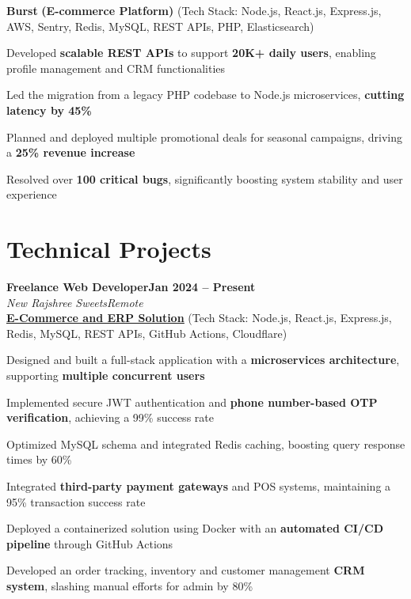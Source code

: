 \documentclass[letterpaper, 10pt]{article}
\newcommand{\heading}[2]{ \hspace{5pt}#1\hfill#2\\[1pt] }  %
\newcommand{\headingBf}[2]{ \heading{\textbf{#1}}{\textbf{#2}} }
\newcommand{\headingIt}[2]{ \heading{\textit{#1}}{\textit{#2}} }
\newenvironment{resume_list}{
\vspace{-3pt}                    %
\begin{itemize}[itemsep=-2pt, parsep=0.5pt, leftmargin=20pt] }{ \end{itemize}  %
\vspace{-3pt}                    %
}
\begin{document}
\vspace{3pt}

\hspace{10pt}\textbf{Burst} \textbf{(E-commerce Platform)} \small{(Tech Stack: Node.js, React.js, Express.js, AWS, Sentry, Redis, MySQL, REST APIs, PHP, Elasticsearch)}
\begin{resume_list}
    \item Developed \textbf{scalable REST APIs} to support \textbf{20K+ daily users}, enabling profile management and CRM functionalities 
    \item Led the migration from a legacy PHP codebase to Node.js microservices, \textbf{cutting latency by 45\%}
    \item Planned and deployed multiple promotional deals for seasonal campaigns, driving a \textbf{25\% revenue increase}
    \item Resolved over \textbf{100 critical bugs}, significantly boosting system stability and user experience
\end{resume_list}

\section{Technical Projects}
\headingBf{Freelance Web Developer}{Jan 2024 -- Present}
\headingIt{New Rajshree Sweets}{Remote}
\vspace{2pt}
\hspace{10pt}\textbf{\href{https://newrajshreesweets.com}{\underline{E-Commerce and ERP Solution}}}
\small{(Tech Stack: Node.js, React.js, Express.js, Redis, MySQL, REST APIs, GitHub Actions, Cloudflare)}
\begin{resume_list}
    \item Designed and built a full-stack application with a \textbf{microservices architecture}, supporting \textbf{multiple concurrent users}
    \item Implemented secure JWT authentication and \textbf{phone number-based OTP verification}, achieving a 99\% success rate
    \item Optimized MySQL schema and integrated Redis caching, boosting query response times by 60\%
    \item Integrated \textbf{third-party payment gateways} and POS systems, maintaining a 95\% transaction success rate
    \item Deployed a containerized solution using Docker with an \textbf{automated CI/CD pipeline} through GitHub Actions
    \item Developed an order tracking, inventory and customer management \textbf{CRM system}, slashing manual efforts for admin by 80\%
\end{resume_list}
\end{document}
